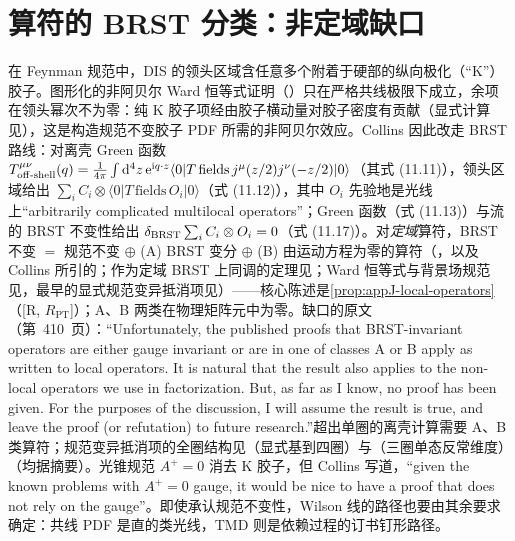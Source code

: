 \section{算符的 BRST 分类：非定域缺口}\label{sec:front-brst}

\begin{remark}\label{rem:front-k-gluon}
在 Feynman 规范中，DIS 的领头区域含任意多个附着于硬部的纵向极化（“K”）胶子。图形化的非阿贝尔 Ward 恒等式证明\cite{Labastida:1984gy}（\cite[第~11.9~节]{Collins2011}）只在严格共线极限下成立，余项在领头幂次不为零：纯 K 胶子项经由胶子横动量对胶子密度有贡献（显式计算见\cite{Collins:2008sg}），这是构造规范不变胶子 PDF 所需的非阿贝尔效应。Collins 因此改走 BRST 路线\cite[第~11.3.2~节，第~407--410~页]{Collins2011}：对离壳 Green 函数 $T^{\mu\nu}_{\rm off\text{-}shell}(q)=\frac1{4\pi}\int\mathrm{d}^4z\,\mathrm{e}^{\mathrm{i} q\cdot z}\langle0|T\,\text{fields}\,j^\mu(z/2)j^\nu(-z/2)|0\rangle$（其式 (11.11)），领头区域给出 $\sum_iC_i\otimes\langle0|T\,\text{fields}\,O_i|0\rangle$（式 (11.12)），其中 $O_i$ 先验地是光线上“arbitrarily complicated multilocal operators”；Green 函数（式 (11.13)）与流的 BRST 不变性给出 $\delta_{\rm BRST}\sum_iC_i\otimes O_i=0$（式 (11.17)）。对\emph{定域}算符，BRST 不变 $=$ 规范不变 $\oplus$ (A) BRST 变分 $\oplus$ (B) 由运动方程为零的算符（\cite{Joglekar:1975nu}，以及 Collins 所引的\cite{Joglekar:1976eb,Joglekar:1976pe,Nakanishi:1990qm}；作为定域 BRST 上同调的定理见\cite{Henneaux:1993jn,Barnich:2000zw}；Ward 恒等式与背景场规范见\cite{Kluberg-Stern:1974iel,Kluberg-Stern:1974nmx,Kluberg-Stern:1975ebk}，最早的显式规范变异抵消项见\cite{DixonTaylor1974}）——核心陈述是\cref{prop:appJ-local-operators}（[R, $R_{\mathrm{PT}}$]）；A、B 两类在物理矩阵元中为零。缺口的原文（第~410~页）：“Unfortunately, the published proofs that BRST-invariant operators are either gauge invariant or are in one of classes A or B apply as written to local operators. It is natural that the result also applies to the non-local operators we use in factorization. But, as far as I know, no proof has been given. For the purposes of the discussion, I will assume the result is true, and leave the proof (or refutation) to future research.”超出单圈的离壳计算需要 A、B 类算符\cite{Hamberg:1991qt,Collins:1994ee}；规范变异抵消项的全圈结构见\cite{Falcioni:2022fdm}（显式基到四圈）与\cite{Gehrmann:2023ksf}（三圈单态反常维度）（均据摘要）。光锥规范 $A^+=0$ 消去 K 胶子，但 Collins 写道，“given the known problems with $A^+=0$ gauge, it would be nice to have a proof that does not rely on the gauge”。即使承认规范不变性，Wilson 线的路径也要由其余要求确定：共线 PDF 是直的类光线，TMD 则是依赖过程的订书钉形路径。
\end{remark}

